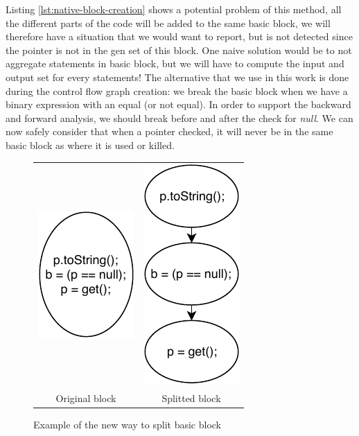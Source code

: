 Listing \ref{lst:native-block-creation} shows a potential problem of this method, all the different parts of the code will be added to the same basic block, we will therefore have a situation that we would want to report, but is not detected since the pointer is not in the gen set of this block. 
One naive solution would be to not aggregate statements in basic block, but we will have to compute the input and output set for every statements! 
\newline
The alternative that we use in this work is done during the control flow graph creation: we break the basic block when we have a binary expression with an equal (or not equal). 
In order to support the backward and forward analysis, we should break before and after the check for \emph{null}. 
We can now safely consider that when a pointer checked, it will never be in the same basic block as where it is used or killed.
\begin{figure}[h]
\caption{Example of the new way to split basic block}
\label{figure:new-way-to-split}
\setlength{\tabcolsep}{24pt}
	\begin{tabular}{cc}
		\includegraphics[]{figure/original-block-cfg.pdf}  &
		\includegraphics[]{figure/splitted-block-cfg.pdf}   \\ 
		Original block & Splitted block
	\end{tabular}
\end{figure}

